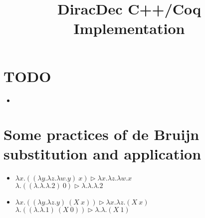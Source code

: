 \documentclass{article}
\title{\textbf{DiracDec C++/Coq Implementation\cite{ExampleCitation}}}
\begin{document}
\maketitle


\newcommand{\reduce}{\triangleright}

\newcommand{\Sort}{\mathsf{Sort}}
\newcommand{\WF}{\mathcal{WF}}

\newcommand{\Index}{\mathsf{Index}}
\newcommand{\Type}{\mathsf{Type}}
\newcommand{\Basis}{\mathsf{Basis}}

\newcommand{\SType}{\mathcal{S}}
\newcommand{\KType}{\mathcal{K}}
\newcommand{\BType}{\mathcal{B}}
\newcommand{\OType}{\mathcal{O}}
\newcommand{\SET}{\mathsf{Set}}

\newcommand{\ZEROK}{\mathbf{0}_\mathcal{K}}
\newcommand{\ZEROB}{\mathbf{0}_\mathcal{B}}
\newcommand{\ZEROO}{\mathbf{0}_\mathcal{O}}

\newcommand{\PAIR}{\mathsf{PAIR}}

\newcommand{\ZERO}{\mathsf{0}}
\newcommand{\ONE}{\mathsf{1}}
\newcommand{\ADDS}{\mathsf{ADDS}}
\newcommand{\ADD}{\mathsf{ADD}}
\newcommand{\MULS}{\mathsf{MULS}}
\newcommand{\MUL}{\mathsf{MUL}}
\newcommand{\CONJ}{\mathsf{CONJ}}
\newcommand{\CJG}{\mathsf{CJG}}
\newcommand{\ADJ}{\mathsf{ADJ}}
\newcommand{\DELTA}{\mathsf{DELTA}}
\newcommand{\DOT}{\mathsf{DOT}}
\newcommand{\SCR}{\mathsf{SCR}}
\newcommand{\TSR}{\mathsf{TSR}}
\newcommand{\KET}{\mathsf{KET}}
\newcommand{\BRA}{\mathsf{BRA}}
\newcommand{\ONEO}{\mathbf{1}_\mathcal{O}}
\newcommand{\OUTER}{\mathsf{OUTER}}
\newcommand{\MULK}{\mathsf{MULK}}
\newcommand{\MULB}{\mathsf{MULB}}
\newcommand{\MULO}{\mathsf{MULO}}


\section{TODO}
\begin{itemize}
    \item \ 
\end{itemize}


\section{Some practices of de Bruijn substitution and application}
\begin{itemize}
    \item $\lambda x .((\lambda y. \lambda z. \lambda w. y)\ x) \reduce \lambda x. \lambda z. \lambda w. x $ 
    \\
    $ \lambda . ((\lambda . \lambda . \lambda. 2)\ 0) \reduce \lambda . \lambda . \lambda.2$

    \item $\lambda x . ((\lambda y. \lambda z. y)\ (X\ x)) \reduce \lambda x . \lambda z . (X\ x)$
    \\
    $\lambda . ((\lambda. \lambda. 1)\ (X\ 0)) \reduce \lambda. \lambda. (X\ 1)$

\end{itemize}
\end{document}
